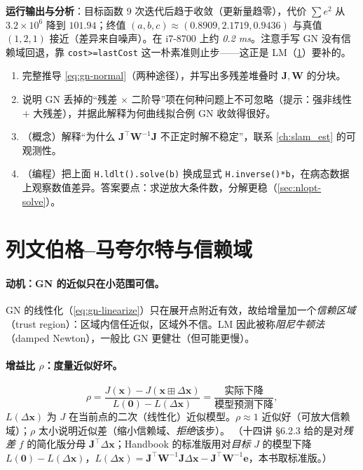 \noindent\textbf{运行输出与分析}\cite{gaoxiang2019slam14}：目标函数 9 次迭代后趋于收敛（更新量趋零），代价 $\sum e^2$ 从 $3.2\times10^6$ 降到 $101.94$；终值 $(a,b,c)\approx(0.8909,2.1719,0.9436)$ 与真值 $(1,2,1)$ 接近（差异来自噪声）。在 i7-8700 上约 \emph{0.2 ms}。注意手写 GN 没有信赖域回退，靠 \texttt{cost>=lastCost} 这一朴素准则止步——这正是 LM（\cref{sec:nlopt-lm}）要补的。

\begin{practice}
\begin{enumerate}
  \item 完整推导 \cref{eq:gn-normal}（两种途径），并写出多残差堆叠时 $\mathbf{J},\mathbf{W}$ 的分块。
  \item 说明 GN 丢掉的“残差 $\times$ 二阶导”项在何种问题上不可忽略（提示：强非线性 $+$ 大残差），并据此解释为何曲线拟合例 GN 收敛得很好。
  \item （概念）解释“为什么 $\mathbf{J}^\top\mathbf{W}^{-1}\mathbf{J}$ 不正定时解不稳定”，联系 \cref{ch:slam_est} 的可观测性。
  \item （编程）把上面 \texttt{H.ldlt().solve(b)} 换成显式 \texttt{H.inverse()*b}，在病态数据上观察数值差异。答案要点：求逆放大条件数，分解更稳（\cref{sec:nlopt-solve}）。
\end{enumerate}
\end{practice}

\section{列文伯格–马夸尔特与信赖域}
\label{sec:nlopt-lm}

\paragraph{动机：GN 的近似只在小范围可信。}
GN 的线性化（\cref{eq:gn-linearize}）只在展开点附近有效，故给增量加一个\emph{信赖区域}（trust region）：区域内信任近似，区域外不信\cite{gaoxiang2019slam14,carlone2026handbook}。LM 因此被称\emph{阻尼牛顿法}（damped Newton），一般比 GN 更健壮（但可能更慢）。

\paragraph{增益比 $\rho$：度量近似好坏。}\cite{gaoxiang2019slam14,carlone2026handbook}
\begin{equation}
  \rho=\frac{J(\mathbf{x})-J(\mathbf{x}\boxplus\Delta\mathbf{x})}{L(\mathbf{0})-L(\Delta\mathbf{x})}
  =\frac{\text{实际下降}}{\text{模型预测下降}},
  \label{eq:lm-rho}
\end{equation}
$L(\Delta\mathbf{x})$ 为 $J$ 在当前点的二次（线性化）近似模型。$\rho\approx1$ 近似好（可放大信赖域）；$\rho$ 太小说明近似差（缩小信赖域、\emph{拒绝}该步）。
（十四讲 §6.2.3 给的是对\emph{残差} $f$ 的简化版分母 $\mathbf{J}^\top\Delta\mathbf{x}$；Handbook 的标准版用对\emph{目标} $J$ 的模型下降 $L(\mathbf{0})-L(\Delta\mathbf{x})$，$L(\Delta\mathbf{x})=\mathbf{J}^\top\mathbf{W}^{-1}\mathbf{J}\Delta\mathbf{x}-\mathbf{J}^\top\mathbf{W}^{-1}\mathbf{e}$，本书取标准版。）

